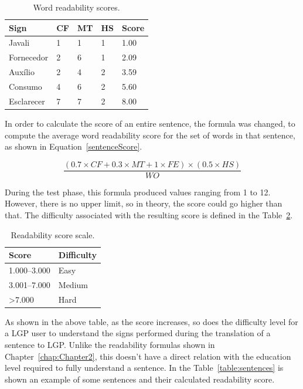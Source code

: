 \begin{table}[H]
    \centering
    \caption{Word readability scores.}
    \label{table:signs}
    \begin{tabular}{l|l|l|l|l}
        {\bfseries Sign} & {\bfseries CF} & {\bfseries MT} & {\bfseries HS} & {\bfseries Score} \\
        \hline
        Javali & 1 & 1 & 1 & 1.00  \\
        \hline
        Fornecedor & 2 & 6 & 1 & 2.09  \\
        \hline
        Auxílio & 2 & 4 & 2 & 3.59 \\
        \hline
        Consumo & 4 & 6 & 2 & 5.60 \\
        \hline
        Esclarecer & 7 & 7 & 2 & 8.00 \\
    \end{tabular}
\end{table}

In order to calculate the score of an entire sentence, the formula was changed, to compute the average word readability score for the set of words in that sentence, as shown in Equation~\ref{sentenceScore}.

\begin{equation}
    \frac{(0.7 \times CF + 0.3 \times MT + 1 \times FE) \times (0.5 \times HS)}{WO}
\label{sentenceScore}
\end{equation}

During the test phase, this formula produced values ranging from 1 to 12.
However, there is no upper limit, so in theory, the score could go higher than that.
The difficulty associated with the resulting score is defined in the Table~\ref{table:readabilityScale}.

\begin{table}[H]
    \centering
    \caption{Readability score scale.}
    \label{table:readabilityScale}
    \begin{tabular}{m{3cm}|m{3cm}}
        {\bfseries Score} & {\bfseries Difficulty} \\
        \hline
        1.000--3.000 & Easy\\
        \hline
        3.001--7.000 & Medium  \\
        \hline
        >7.000 & Hard \\
        \hline
    \end{tabular}
\end{table}

As shown in the above table, as the score increases, so does the difficulty level for a \gls{LGP} user to understand the signs performed during the translation of a sentence to \gls{LGP}.
Unlike the readability formulas shown in Chapter~\ref{chap:Chapter2}, this doesn't have a direct relation with the education level required to fully understand a sentence.
In the Table~\ref{table:sentences} is shown an example of some sentences and their calculated readability score.

